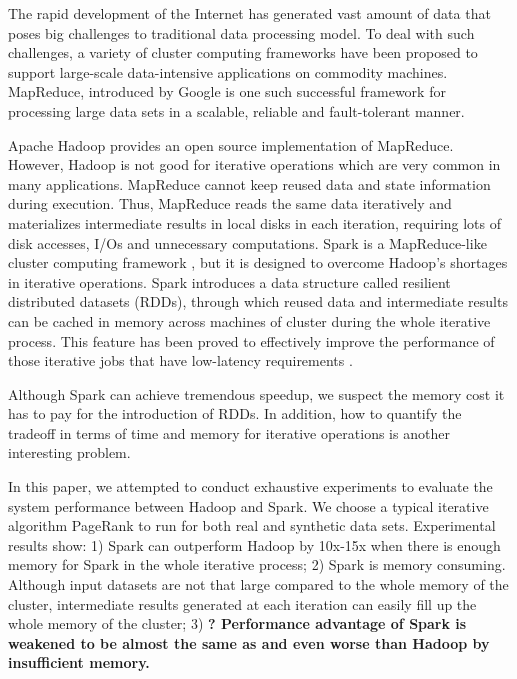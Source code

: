 \documentclass[12pt,conference,letterpaper]{IEEEtran}
\begin{document}
The rapid development of the Internet has generated vast amount of data that poses big challenges to traditional data processing model. To deal with such challenges, a variety of cluster computing frameworks have been proposed to support large-scale data-intensive applications on commodity machines. MapReduce, introduced by Google\cite{jdean2004} is one such successful framework for processing large data sets in a scalable, reliable and fault-tolerant manner. 

Apache Hadoop\cite{url_hadoop} provides an open source implementation of MapReduce.
However, Hadoop is not good for iterative operations which are very common in many applications. MapReduce cannot keep reused data and state information during execution. Thus, MapReduce reads the same data iteratively and materializes intermediate results in local disks in each iteration, requiring lots of disk accesses, I/Os and unnecessary computations. Spark is a MapReduce-like cluster computing framework \cite{url_spark, matei2010}, but it is designed to overcome Hadoop's shortages in iterative operations. Spark introduces a data structure called resilient distributed datasets (RDDs)\cite{matei2012}, through which reused data and intermediate results can be cached in memory across machines of cluster during the whole iterative process. This feature has been proved to effectively improve the performance of those iterative jobs that have low-latency requirements \cite{matei2012}.


Although Spark can achieve tremendous speedup, we suspect the memory cost it has to pay for the introduction of RDDs.  In addition, how to quantify the tradeoff in terms of time and memory for iterative operations is another interesting problem. %

In this paper, we attempted to conduct exhaustive experiments to evaluate the system performance between Hadoop and Spark. We choose a typical iterative algorithm PageRank \cite{page1999} to run for both real and synthetic data sets. Experimental results show: 1) Spark can outperform Hadoop by 10x-15x when there is enough memory for Spark in the whole iterative process; 2) Spark is memory consuming. Although input datasets are not that large compared to the whole memory of the cluster, intermediate results generated at each iteration can easily fill up the whole memory of the cluster; 3) {\bf ? Performance advantage of Spark is weakened to be almost the same as and even worse than Hadoop by insufficient memory.}
\end{document}
